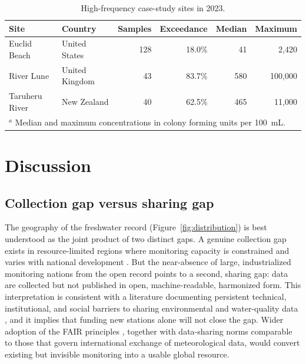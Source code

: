 \documentclass{agujournal2019}
\begin{document}
\begin{table}
\caption{High-frequency case-study sites in 2023.}
\centering
\begin{tabular}{l l r r r r}
\hline
Site & Country & Samples & Exceedance & Median & Maximum \\
\hline
Euclid Beach & United States & 128 & 18.0\% & 41 & 2{,}420 \\
River Lune & United Kingdom & 43 & 83.7\% & 580 & 100{,}000 \\
Taruheru River & New Zealand & 40 & 62.5\% & 465 & 11{,}000 \\
\hline
\multicolumn{6}{l}{$^a$ Median and maximum concentrations in colony forming units per 100~mL.}
\end{tabular}
\label{tab:cases}
\end{table}

\section{Discussion}

\subsection{Collection gap versus sharing gap}
The geography of the freshwater record (Figure~\ref{fig:distribution}) is best understood as the joint product of two distinct gaps. A genuine collection gap exists in resource-limited regions where monitoring capacity is constrained and varies with national development \cite{kirschke2020capacity}. But the near-absence of large, industrialized monitoring nations from the open record points to a second, sharing gap: data are collected but not published in open, machine-readable, harmonized form. This interpretation is consistent with a literature documenting persistent technical, institutional, and social barriers to sharing environmental and water-quality data \cite{brasier2017barriers,sugg2021social,hazell2023sociotechnical,heacock2022enhancing,kumpel2020data}, and it implies that funding new stations alone will not close the gap. Wider adoption of the FAIR principles \cite{wilkinson2016fair}, together with data-sharing norms comparable to those that govern international exchange of meteorological data, would convert existing but invisible monitoring into a usable global resource.
\end{document}

